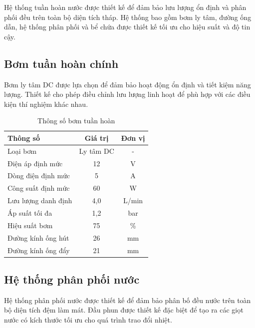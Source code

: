 \documentclass[../main.tex]{subfiles}
\begin{document}
Hệ thống tuần hoàn nước được thiết kế để đảm bảo lưu lượng ổn định và phân phối đều trên toàn bộ diện tích tháp. Hệ thống bao gồm bơm ly tâm, đường ống dẫn, hệ thống phân phối và bể chứa được thiết kế tối ưu cho hiệu suất và độ tin cậy.

\subsection{Bơm tuần hoàn chính}
\label{sec:circulation_pump}

Bơm ly tâm DC được lựa chọn để đảm bảo hoạt động ổn định và tiết kiệm năng lượng. Thiết kế cho phép điều chỉnh lưu lượng linh hoạt để phù hợp với các điều kiện thí nghiệm khác nhau.

\begin{table}[H]
\centering
\renewcommand{\arraystretch}{1.1}
\caption{Thông số bơm tuần hoàn}
\label{tab:pump_specs}
\begin{tabular}{|l|c|c|}
\hline
\textbf{Thông số} & \textbf{Giá trị} & \textbf{Đơn vị} \\
\hline
Loại bơm & Ly tâm DC & - \\
\hline
Điện áp định mức & 12 & V \\
\hline
Dòng điện định mức & 5 & A \\
\hline
Công suất định mức & 60 & W \\
\hline
Lưu lượng danh định & 4,0 & L/min \\
\hline
Áp suất tối đa & 1,2 & bar \\
\hline
Hiệu suất bơm & 75 & \% \\
\hline
Đường kính ống hút & 26 & mm \\
\hline
Đường kính ống đẩy & 21 & mm \\
\hline
\end{tabular}
\end{table}

\subsection{Hệ thống phân phối nước}
\label{sec:water_distribution}

Hệ thống phân phối nước được thiết kế để đảm bảo phân bố đều nước trên toàn bộ diện tích đệm làm mát. Đầu phun được thiết kế đặc biệt để tạo ra các giọt nước có kích thước tối ưu cho quá trình trao đổi nhiệt.
\end{document}
